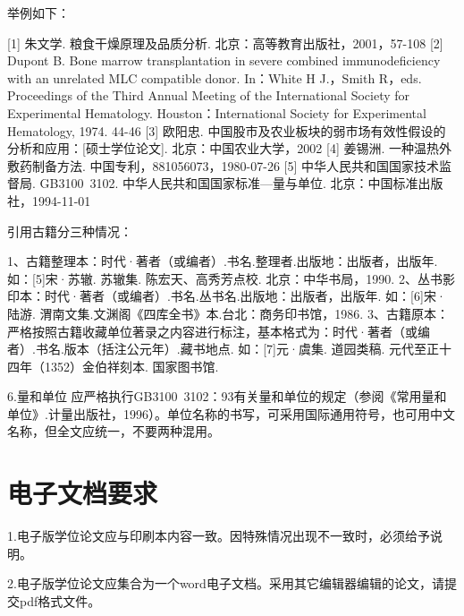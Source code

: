举例如下：

[1] 朱文学. 粮食干燥原理及品质分析. 北京：高等教育出版社，2001，57-108
[2] Dupont B. Bone marrow transplantation in severe combined immunodeficiency with an unrelated MLC compatible donor. In：White H J.，Smith R，eds. Proceedings of the Third Annual Meeting of the International Society for Experimental Hematology. Houston：International Society for Experimental Hematology, 1974. 44-46
[3] 欧阳忠. 中国股市及农业板块的弱市场有效性假设的分析和应用：[硕士学位论文]. 北京：中国农业大学，2002
[4] 姜锡洲. 一种温热外敷药制备方法. 中国专利，881056073，1980-07-26
[5] 中华人民共和国国家技术监督局. GB3100~3102. 中华人民共和国国家标准—量与单位. 北京：中国标准出版社，1994-11-01

引用古籍分三种情况：

1、古籍整理本：时代·著者（或编者）.书名.整理者.出版地：出版者，出版年.
如：[5]宋·苏辙. 苏辙集. 陈宏天、高秀芳点校. 北京：中华书局，1990.
2、丛书影印本：时代·著者（或编者）.书名.丛书名.出版地：出版者，出版年.
如：[6]宋·陆游. 渭南文集.文渊阁《四库全书》本.台北：商务印书馆，1986.
3、古籍原本：严格按照古籍收藏单位著录之内容进行标注，基本格式为：时代·著者（或编者）.书名.版本（括注公元年）.藏书地点.
如：[7]元·虞集. 道园类稿. 元代至正十四年（1352）金伯祥刻本. 国家图书馆.

6.量和单位
应严格执行GB3100~3102：93有关量和单位的规定（参阅《常用量和单位》.计量出版社，1996）。单位名称的书写，可采用国际通用符号，也可用中文名称，但全文应统一，不要两种混用。

\section{电子文档要求}

1.电子版学位论文应与印刷本内容一致。因特殊情况出现不一致时，必须给予说明。

2.电子版学位论文应集合为一个word电子文档。采用其它编辑器编辑的论文，请提交pdf格式文件。